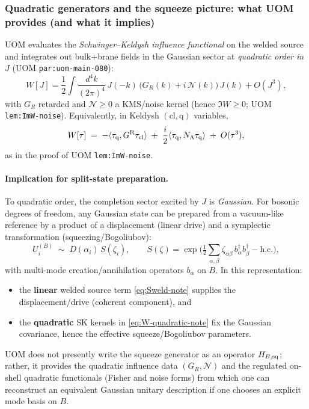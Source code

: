 \documentclass[11pt]{article}
\theoremstyle{definition}
\theoremstyle{plain}
\theoremstyle{remark}
\begin{document}
\subsubsection*{Quadratic generators and the squeeze picture: what UOM provides (and what it implies)}
\label{subsec:quadratic-generators}

UOM evaluates the \emph{Schwinger--Keldysh influence functional} on the welded source and integrates out bulk+brane fields
in the Gaussian sector at \emph{quadratic order in $J$} (UOM \texttt{par:uom-main-080}):
\begin{equation}
W[J]
=\frac12\!\int\!\frac{d^4k}{(2\pi)^4}\,
J(-k)\,\big(G_R(k)+i\,\mathcal N(k)\big)\,J(k)
+O(J^3),
\label{eq:W-quadratic-note}
\end{equation}
with $G_R$ retarded and $\mathcal N\ge 0$ a KMS/noise kernel (hence $\Im W\ge 0$; UOM \texttt{lem:ImW-noise}).
Equivalently, in Keldysh $(\mathrm{cl},\mathrm{q})$ variables,
\[
W[\tau]\;=\;-\langle \tau_{\rm q},G^{\rm R}\tau_{\rm cl}\rangle\;+\;\frac{i}{2}\langle\tau_{\rm q},N_\Lambda\tau_{\rm q}\rangle\;+\;O(\tau^3),
\]
as in the proof of UOM \texttt{lem:ImW-noise}.

\paragraph{Implication for split-state preparation.}
To quadratic order, the completion sector excited by $J$ is \emph{Gaussian}. For bosonic degrees of freedom, any Gaussian
state can be prepared from a vacuum-like reference by a product of a displacement (linear drive) and a symplectic
transformation (squeezing/Bogoliubov):
\begin{equation}
U_i^{(B)}\;\sim\;D(\alpha_i)\,S(\zeta_i),
\qquad
S(\zeta)=\exp\!\Big(\tfrac12\sum_{\alpha,\beta}\zeta_{\alpha\beta}\,b_\alpha^\dagger b_\beta^\dagger-\mathrm{h.c.}\Big),
\label{eq:gaussian-prep}
\end{equation}
with multi-mode creation/annihilation operators $b_\alpha$ on $B$.
In this representation:
\begin{itemize}[leftmargin=1.6em]
\item the \textbf{linear} welded source term \eqref{eq:Sweld-note} supplies the displacement/drive (coherent component),
and
\item the \textbf{quadratic} SK kernels in \eqref{eq:W-quadratic-note} fix the Gaussian covariance, hence the effective
squeeze/Bogoliubov parameters.
\end{itemize}
UOM does not presently write the squeeze generator as an operator $H_{B,{\rm sq}}$; rather, it provides the quadratic
influence data $(G_R,\mathcal N)$ and the regulated on-shell quadratic functionals (Fisher and noise forms) from which
one can reconstruct an equivalent Gaussian unitary description if one chooses an explicit mode basis on $B$.
\end{document}
